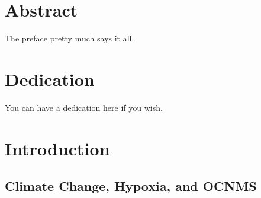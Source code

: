 \documentclass[12pt,twoside]{reedthesis}
\begin{document}
    \tableofcontents
    \listoftables
    \listoffigures

    \chapter*{Abstract}
	The preface pretty much says it all.
	
	\chapter*{Dedication}
	You can have a dedication here if you wish.

  \mainmatter %
  \pagestyle{fancyplain} %


    \chapter*{Introduction}

	
	

\section{Climate Change, Hypoxia, and OCNMS}
\end{document}
